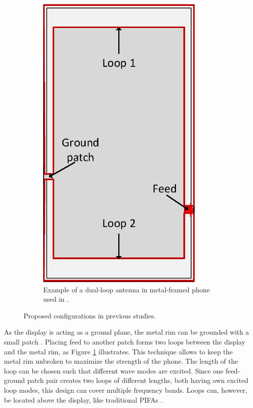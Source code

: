 \begin{figure}[ht!]
\begin{subfigure}[b]{0.4\textwidth}
        \includegraphics[width=0.9\textwidth]{img/dual_loop.eps}
        \caption{Example of a dual-loop antenna in metal-framed phone used in \cite{ban_dual_loop, stanley_lte_mimo}.}
        \label{fig:dual_loop}
    \end{subfigure}
    \caption{Proposed configurations in previous studies.}
    \label{fig:metal_rim_examples}
\end{figure}

As the display is acting as a ground plane, the metal rim can be grounded with a small patch \cite{ban_dual_loop, stanley_lte_mimo}. Placing feed to another patch forms two loops between the display and the metal rim, as Figure \ref{fig:dual_loop} illustrates. This technique allows to keep the metal rim unbroken to maximize the strength of the phone. The length of the loop can be chosen such that different wave modes are excited. Since one feed-ground patch pair creates two loops of different lengths, both having own excited loop modes, this design can cover multiple frequency bands. Loops can, however, be located above the display, like traditional PIFAs \cite{reconf_narrow,hybrid}. %

